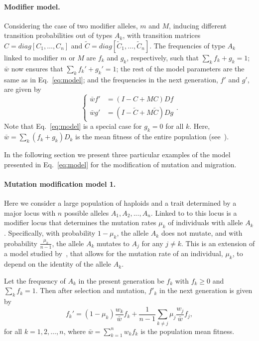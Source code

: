 \documentclass[9pt, a4paper, twocolumn]{extarticle}
\begin{document}
\paragraph*{Modifier model.}
Considering the case of two modifier alleles, $m$ and $M$, inducing different transition probabilities out of types $A_k$, with transition matrices $C=diag[C_1, \ldots, C_n]$ and $\tilde{C}=diag[\tilde{C}_1, \ldots, \tilde{C}_n]$.
The frequencies of type $A_k$ linked to modifier $m$ or $M$ are $f_k$ and $g_k$, respectively, such that $\sum_k{f_k+g_k}=1$;
$\bar{w}$ now ensures that $\sum_{k}{f_k'+g_k'}=1$;
the rest of the model parameters are the same as in Eq.~\ref{eq:model};
and the frequencies in the next generation, $f'$ and $g'$, are given by
\begin{equation}
\begin{cases}
\bar{w} f' &= (I-C+MC)D f \\
\bar{w} g' &= (I-\tilde{C}+M\tilde{C})D g
\end{cases}.
\label{eq:modifier_model}
\end{equation}
Note that Eq.~\ref{eq:model} is a special case for $g_k=0$ for all $k$.
Here, $\bar{w}=\sum_{k}{(f_k+g_k)D_k}$ is the mean fitness of the entire population (see~). 

In the following section we present three particular examples of the model presented in Eq.~\ref{eq:model} for the modification of mutation and migration.

\paragraph*{Mutation modification model 1.}\label{sec:mut_model_1}

Here we consider a large population of haploids and a trait determined by a major locus with $n$ possible alleles $A_1, A_2, ..., A_n$.
Linked to to this locus is a modifier locus that determines the mutation rates $\mu_k$ of individuals with allele $A_k$.
Specifically, with probability $1-\mu_k$, the allele $A_k$ does not mutate, and with probability $\frac{\mu_k}{n-1}$, the allele $A_k$ mutates to $A_j$ for any $j \ne k$.
This is an extension of a model studied by~\citet{Altenberg2017}, that allows for the mutation rate of an individual, $\mu_k$, to depend on the identity of the allele $A_k$.

Let the frequency of $A_k$ in the present generation be $f_k$ with $f_k \ge 0$ and $\sum_k{f_k}=1$.
Then after selection and mutation, $f'_k$ in the next generation is given by
\begin{equation}
f_k' = (1 - \mu_k) \frac{w_k}{\bar{w}} f_k + \frac{1}{n-1} \sum_{k \ne j}{\mu_j \frac{w_j}{\bar{w}} f_j},
\label{eq:mutation_model_1}
\end{equation}
for all $k=1,2,\ldots,n$, where $\bar{w} = \sum_{k=1}^{n}{w_k f_k}$ is the population mean fitness.
\end{document}
